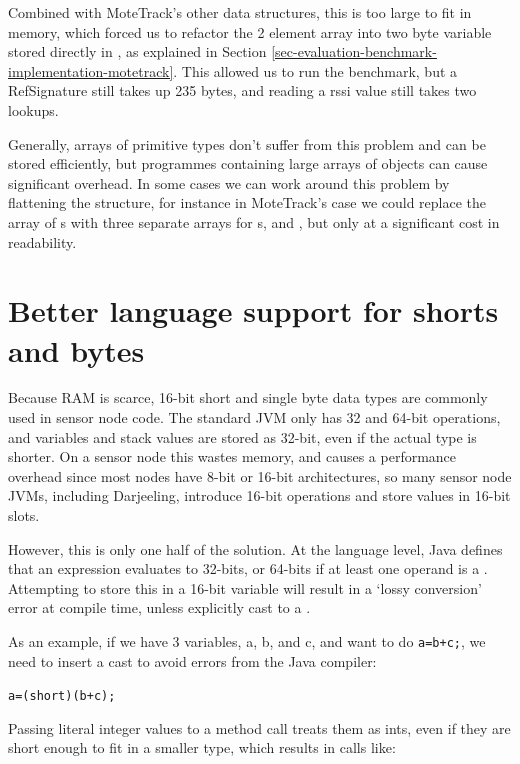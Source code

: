 Combined with MoteTrack's other data structures, this is too large to fit in memory, which forced us to refactor the 2 element  array into two byte variable stored directly in , as explained in Section \ref{sec-evaluation-benchmark-implementation-motetrack}. This allowed us to run the benchmark, but a RefSignature still takes up 235 bytes, and reading a rssi value still takes two lookups.

Generally, arrays of primitive types don't suffer from this problem and can be stored efficiently, but programmes containing large arrays of objects can cause significant overhead. In some cases we can work around this problem by flattening the structure, for instance in MoteTrack's case we could replace the array of s with three separate arrays for s,  and , but only at a significant cost in readability.




\section{Better language support for shorts and bytes}
\label{sec-small-datatypes}
Because RAM is scarce, 16-bit short and single byte data types are commonly used in sensor node code. The standard JVM only has 32 and 64-bit operations, and variables and stack values are stored as 32-bit, even if the actual type is shorter. On a sensor node this wastes memory, and causes a performance overhead since most nodes have 8-bit or 16-bit architectures, so many sensor node JVMs, including Darjeeling, introduce 16-bit operations and store values in 16-bit slots.

However, this is only one half of the solution. At the language level, Java defines that an expression evaluates to 32-bits, or 64-bits if at least one operand is a . Attempting to store this in a 16-bit variable will result in a `lossy conversion' error at compile time, unless explicitly cast to a .

As an example, if we have 3  variables, a, b, and c, and want to do 
\texttt{a=b+c;}, we need to insert a cast to avoid errors from the Java compiler:

\texttt{a=(short)(b+c);}

Passing literal integer values to a method call treats them as ints, even if they are short enough to fit in a smaller type, which results in calls like: 

